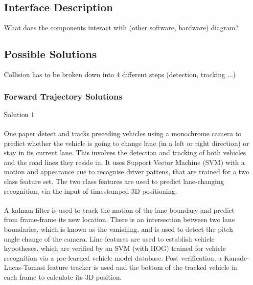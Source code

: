 \documentclass[]{report}
\begin{document}
\subsection{Interface Description} What does the components interact with (other software, hardware) diagram?

\subsection{Possible Solutions} Collision has to be broken down into 4 different steps (detection, tracking ...)

\subsubsection{Forward Trajectory Solutions}

Solution 1

\paragraph {} One paper \citep{multi-cue} detect and tracks preceding vehicles using a monochrome camera to predict whether the vehicle is going to change lane (in a left or right direction) or stay in its current lane. This involves the detection and tracking of both vehicles and the road lines they reside in. It uses Support Vector Machine (SVM) with a motion and appearance cue to recognise driver pattens, that are trained for a two class feature set. The two class features are used to predict lane-changing recognition, via the input of timestamped 3D positioning. 

\paragraph{}A kalman filter is used to track the motion of the lane boundary and predict from frame-frame its new location. There is an intersection between two lane boundaries, which is known as the vanishing, and is used to detect the pitch angle change of the camera. Line features are used to establish vehicle hypotheses, which are verified by an SVM (with HOG) trained for vehicle recognition via a pre-learned vehicle model database. Post verification, a Kanade-Lucas-Tomasi feature tracker is used and the bottom of the tracked vehicle in each frame to calculate its 3D position.
\end{document}
